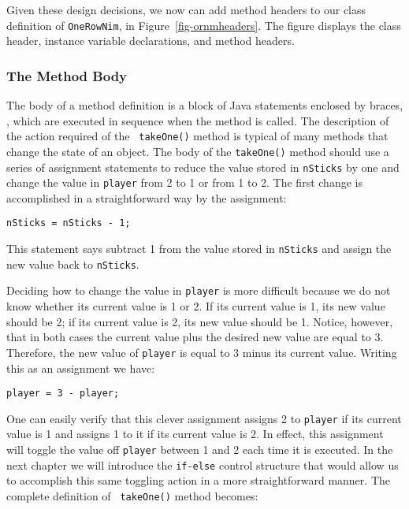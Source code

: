 Given these design decisions, we now can add method headers to our
class definition of {\tt OneRowNim}, in Figure~\ref{fig-ornmheaders}.
The figure displays the class header, instance variable declarations,
and method headers.

\subsubsection*{The Method Body}

\noindent The body of a method definition is a block of Java
  statements enclosed by braces,
{}, which are executed in sequence when the method
is called.  The description of the action required of the {\tt
takeOne()} method is typical of many methods that change the state of
an object.  The body of the {\tt takeOne()} method should use a series
of assignment statements to reduce the value stored in {\tt nSticks}
by one and change the value in {\tt player} from 2 to 1 or from 1 to
2. The first change is accomplished in a straightforward way by the
assignment:

\begin{jjjlisting}
\begin{lstlisting}
nSticks = nSticks - 1;
\end{lstlisting}
\end{jjjlisting}

\noindent This statement says subtract 1 from the value stored in {\tt nSticks}
and assign the new value back to {\tt nSticks}.

Deciding how to change the value in {\tt player} is more difficult
because we do not know whether its current value is 1 or 2.  If its
current value is 1, its new value should be 2; if its current value is
2, its new value should be 1. Notice, however, that in both cases the
current value plus the desired new value are equal to 3.  Therefore,
the new value of {\tt player} is equal to 3 minus its current value.
Writing this as an assignment we have:

\begin{jjjlisting}
\begin{lstlisting}
player = 3 - player;
\end{lstlisting}
\end{jjjlisting}

\noindent One can easily verify that this clever assignment 
assigns 2 to {\tt player} if its current value is 1 and assigns 1 to
it if its current value is 2.  In effect, this assignment will toggle
the value off {\tt player} between 1 and 2 each time it is executed.
In the next chapter we will introduce the {\tt if-else} control
structure that would allow us to accomplish this same toggling action
in a more straightforward manner.  The complete definition of {\tt
takeOne()} method becomes:


